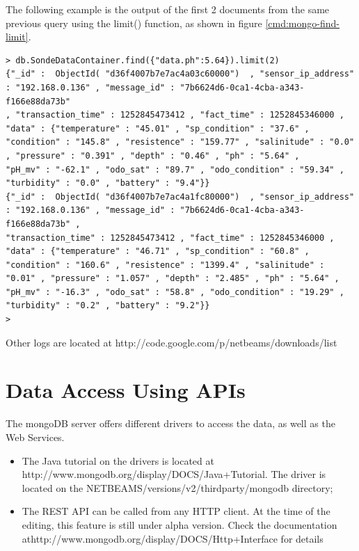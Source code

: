 The following example is the output of the first 2 documents from the same
previous query using the limit() function, as shown in figure
\ref{cmd:mongo-find-limit}.

\lstset{label=cmd:mongo-find-limit,caption=Query Element with specific
projection limiting the result set size}
\begin{lstlisting}
> db.SondeDataContainer.find({"data.ph":5.64}).limit(2)
{"_id" :  ObjectId( "d36f4007b7e7ac4a03c60000")  , "sensor_ip_address" : "192.168.0.136" , "message_id" : "7b6624d6-0ca1-4cba-a343-f166e88da73b"
, "transaction_time" : 1252845473412 , "fact_time" : 1252845346000 , "data" : {"temperature" : "45.01" , "sp_condition" : "37.6" ,
"condition" : "145.8" , "resistence" : "159.77" , "salinitude" : "0.0" , "pressure" : "0.391" , "depth" : "0.46" , "ph" : "5.64" ,
"pH_mv" : "-62.1" , "odo_sat" : "89.7" , "odo_condition" : "59.34" , "turbidity" : "0.0" , "battery" : "9.4"}}
{"_id" :  ObjectId( "d36f4007b7e7ac4a1fc80000")  , "sensor_ip_address" : "192.168.0.136" , "message_id" : "7b6624d6-0ca1-4cba-a343-f166e88da73b" ,
"transaction_time" : 1252845473412 , "fact_time" : 1252845346000 , "data" : {"temperature" : "46.71" , "sp_condition" : "60.8" ,
"condition" : "160.6" , "resistence" : "1399.4" , "salinitude" : "0.01" , "pressure" : "1.057" , "depth" : "2.485" , "ph" : "5.64" ,
"pH_mv" : "-16.3" , "odo_sat" : "58.8" , "odo_condition" : "19.29" , "turbidity" : "0.2" , "battery" : "9.2"}}
>
\end{lstlisting}

Other logs are located at
http://code.google.com/p/netbeams/downloads/list

\section{Data Access Using APIs}

The mongoDB server offers different drivers to access the data, as well as the
Web Services.

\begin{itemize}
  \item The Java tutorial on the drivers is located at
    http://www.mongodb.org/display/DOCS/Java+Tutorial. The driver is located on
    the NETBEAMS/versions/v2/thirdparty/mongodb directory;  
  \item The REST API can be called from any HTTP client. At the time of the
  editing, this feature is still under alpha version. Check the documentation
  athttp://www.mongodb.org/display/DOCS/Http+Interface for details 
\end{itemize}

